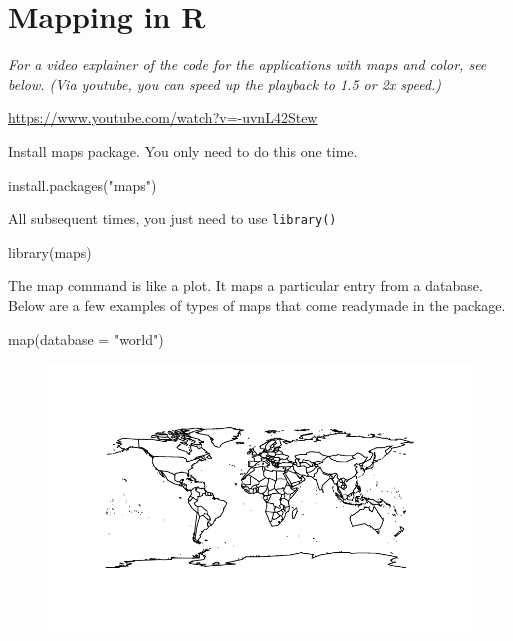\documentclass[
  letterpaper,
  DIV=11,
  numbers=noendperiod]{scrreprt}
\newenvironment{Shaded}{\begin{snugshade}}{\end{snugshade}}
\newcommand{\AttributeTok}[1]{\textcolor[rgb]{0.40,0.45,0.13}{#1}}
\newcommand{\FunctionTok}[1]{\textcolor[rgb]{0.28,0.35,0.67}{#1}}
\newcommand{\NormalTok}[1]{\textcolor[rgb]{0.00,0.23,0.31}{#1}}
\newcommand{\StringTok}[1]{\textcolor[rgb]{0.13,0.47,0.30}{#1}}
\begin{document}
\hypertarget{mapping-in-r}{%
\section{Mapping in R}\label{mapping-in-r}}

\emph{For a video explainer of the code for the applications with maps
and color, see below. (Via youtube, you can speed up the playback to 1.5
or 2x speed.)}

\url{https://www.youtube.com/watch?v=-uvnL42Stew}

Install maps package. You only need to do this one time.

\begin{Shaded}
\begin{Highlighting}[]
\FunctionTok{install.packages}\NormalTok{(}\StringTok{"maps"}\NormalTok{)}
\end{Highlighting}
\end{Shaded}

All subsequent times, you just need to use \texttt{library()}

\begin{Shaded}
\begin{Highlighting}[]
\FunctionTok{library}\NormalTok{(maps)}
\end{Highlighting}
\end{Shaded}

The map command is like a plot. It maps a particular entry from a
database. Below are a few examples of types of maps that come readymade
in the package.

\begin{Shaded}
\begin{Highlighting}[]
\FunctionTok{map}\NormalTok{(}\AttributeTok{database =} \StringTok{"world"}\NormalTok{)}
\end{Highlighting}
\end{Shaded}

\begin{figure}[H]

{\centering \includegraphics{12-Maps_files/figure-pdf/unnamed-chunk-3-1.pdf}

}

\end{figure}
\end{document}
